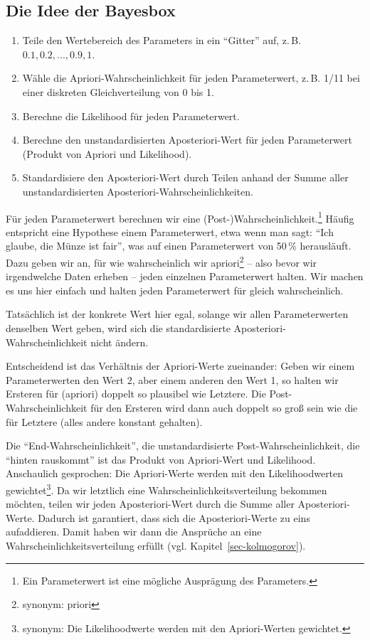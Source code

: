 \documentclass[
  ngerman,
  letterpaper,
  twoside,
  open=any]{scrbook}
\providecommand{\tightlist}{%
  \setlength{\itemsep}{0pt}\setlength{\parskip}{0pt}}\usepackage{longtable,booktabs,array}
\theoremstyle{definition}
\theoremstyle{plain}
\theoremstyle{definition}
\theoremstyle{definition}
\theoremstyle{definition}
\theoremstyle{definition}
\theoremstyle{remark}
\begin{document}
\subsection{Die Idee der Bayesbox}\label{die-idee-der-bayesbox}

\begin{enumerate}
\def\labelenumi{\arabic{enumi}.}
\tightlist
\item
  Teile den Wertebereich des Parameters in ein \enquote{Gitter} auf,
  z.\,B. \(0.1, 0.2, ..., 0.9, 1\).
\item
  Wähle die Apriori-Wahrscheinlichkeit für jeden Parameterwert, z.\,B.
  1/11 bei einer diskreten Gleichverteilung von 0 bis 1.
\item
  Berechne die Likelihood für jeden Parameterwert.
\item
  Berechne den unstandardisierten Aposteriori-Wert für jeden
  Parameterwert (Produkt von Apriori und Likelihood).
\item
  Standardisiere den Aposteriori-Wert durch Teilen anhand der Summe
  aller unstandardisierten Aposteriori-Wahrscheinlichkeiten.
\end{enumerate}

Für jeden Parameterwert berechnen wir eine
(Post-)Wahrscheinlichkeit.\footnote{Ein Parameterwert ist eine mögliche
  Ausprägung des Parameters.} Häufig entspricht eine Hypothese einem
Parameterwert, etwa wenn man sagt: \enquote{Ich glaube, die Münze ist
fair}, was auf einen Parameterwert von 50\,\% herausläuft. Dazu geben
wir an, für wie wahrscheinlich wir apriori\footnote{synonym: priori} --
also bevor wir irgendwelche Daten erheben -- jeden einzelnen
Parameterwert halten. Wir machen es uns hier einfach und halten jeden
Parameterwert für gleich wahrscheinlich.

Tatsächlich ist der konkrete Wert hier egal, solange wir allen
Parameterwerten denselben Wert geben, wird sich die standardisierte
Aposteriori-Wahrscheinlichkeit nicht ändern.

Entscheidend ist das Verhältnis der Apriori-Werte zueinander: Geben wir
einem Parameterwerten den Wert 2, aber einem anderen den Wert 1, so
halten wir Ersteren für (apriori) doppelt so plausibel wie Letztere. Die
Post-Wahrscheinlichkeit für den Ersteren wird dann auch doppelt so groß
sein wie die für Letztere (alles andere konstant gehalten).

Die \enquote{End-Wahrscheinlichkeit}, die unstandardisierte
Post-Wahrscheinlichkeit, die \enquote{hinten rauskommt} ist das Produkt
von Apriori-Wert und Likelihood. Anschaulich gesprochen: Die
Apriori-Werte werden mit den Likelihoodwerten gewichtet\footnote{synonym:
  Die Likelihoodwerte werden mit den Apriori-Werten gewichtet.}. Da wir
letztlich eine Wahrscheinlichkeitsverteilung bekommen möchten, teilen
wir jeden Aposteriori-Wert durch die Summe aller Aposteriori-Werte.
Dadurch ist garantiert, dass sich die Aposteriori-Werte zu eins
aufaddieren. Damit haben wir dann die Ansprüche an eine
Wahrscheinlichkeitsverteilung erfüllt (vgl.
Kapitel~\ref{sec-kolmogorov}).
\end{document}

